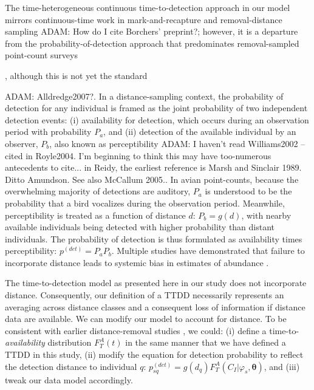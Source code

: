 \documentclass[useAMS,usenatbib,referee,12pt]{article}
\newcommand{\adam}[1]{{\color{blue} ADAM: #1}}
\newcommand{\pdet}{p^{(det)}}
\begin{document}

The time-heterogeneous continuous time-to-detection approach in our model mirrors continuous-time work in mark-and-recapture \citep{HwangChao2002, FarcomeniScacciatelli2013, Borchers2014} and removal-distance sampling \adam{How do I cite Borchers' preprint?}; however, it is a departure from the probability-of-detection approach that predominates removal-sampled point-count surveys

\citep{Farnsworth2002, Farnsworth2005, Alldredge2007, EffordDawson2009, Etterson2009, Reidy2011}, although this is not yet the standard \citep{Solymos2013, Amundson2014, Reidy2016}


\citep{Farnsworth2005, Diefenbach2007, Solymos2013, Amundson2014}\adam{Alldredge2007?}.  
In a distance-sampling context, the probability of detection for any individual is framed as the joint probability of two independent detection events: (i) availability for detection, which occurs during an observation period with probability $P_a$, and (ii) detection of the available individual by an observer, $P_b$, also known as perceptibility \citep{Williams2002, Kery2008, Nichols2009}\adam{I haven't read Williams2002 -- cited in Royle2004.  
I'm  beginning to think this may have too-numerous antecedents to cite... in Reidy, the earliest reference is Marsh and Sinclair 1989.  
Ditto Amundson.
See also McCallum 2005.}.  
In avian point-counts, because the overwhelming majority of detections are auditory, $P_a$ is understood to be the probability that a bird vocalizes during the observation period.  
Meanwhile, perceptibility is treated as a function of distance $d$: $P_b = g(d)$, with nearby available individuals being detected with higher probability than distant individuals.  
The probability of detection is thus formulated as availability times perceptibility: $\pdet = P_aP_b$.  
Multiple studies have demonstrated that failure to incorporate distance leads to systemic bias in estimates of abundance \citep{EffordDawson2009, Solymos2013}.

The time-to-detection model as presented here in our study does not incorporate distance.  
Consequently, our definition of a TTDD necessarily represents an averaging across distance classes and a consequent loss of information if distance data are available.  
We can modify our model to account for distance.  
To be consistent with earlier distance-removal studies \citep{Farnsworth2005, Amundson2014}, we could: (i) define a time-to-\textit{availability} distribution $F_T^A(t)$ in the same manner that we have defined a TTDD in this study, (ii) modify the equation for detection probability to reflect the detection distance to individual $q$: $p_{sq}^{(det)} = g(d_q) F_T^A(C_I|\varphi_s, \boldsymbol{\theta})$, and (iii) tweak our data model accordingly.
\end{document}
